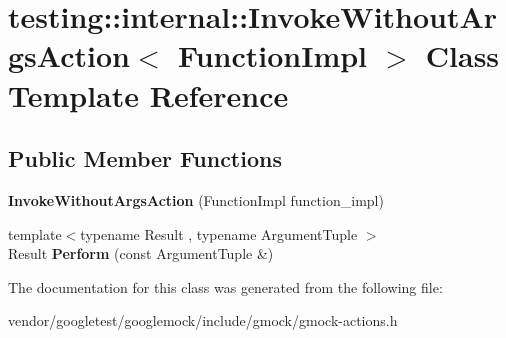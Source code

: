 \hypertarget{classtesting_1_1internal_1_1InvokeWithoutArgsAction}{}\section{testing\+:\+:internal\+:\+:Invoke\+Without\+Args\+Action$<$ Function\+Impl $>$ Class Template Reference}
\label{classtesting_1_1internal_1_1InvokeWithoutArgsAction}
\subsection*{Public Member Functions}
\begin{DoxyCompactItemize}
\item 
{\bfseries Invoke\+Without\+Args\+Action} (Function\+Impl function\+\_\+impl)\hypertarget{classtesting_1_1internal_1_1InvokeWithoutArgsAction_a05d4006d8ab70e78172bf678b1d15f18}{}\label{classtesting_1_1internal_1_1InvokeWithoutArgsAction_a05d4006d8ab70e78172bf678b1d15f18}

\item 
{\footnotesize template$<$typename Result , typename Argument\+Tuple $>$ }\\Result {\bfseries Perform} (const Argument\+Tuple \&)\hypertarget{classtesting_1_1internal_1_1InvokeWithoutArgsAction_abdad2b7d19ff1cbd1d07a4bd585e3f4c}{}\label{classtesting_1_1internal_1_1InvokeWithoutArgsAction_abdad2b7d19ff1cbd1d07a4bd585e3f4c}

\end{DoxyCompactItemize}


The documentation for this class was generated from the following file\+:\begin{DoxyCompactItemize}
\item 
vendor/googletest/googlemock/include/gmock/gmock-\/actions.\+h\end{DoxyCompactItemize}
